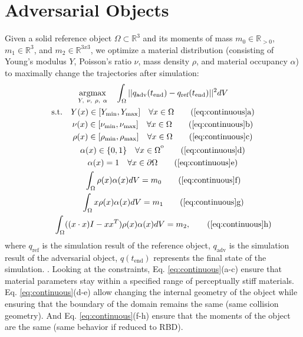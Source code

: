 \section{Adversarial Objects}\label{sec:method}
%
%
Given a solid reference object $\Omega \subset \mathbb{R}^3$ and its moments of mass $m_0 \in \mathbb{R}_{>0}$, $m_1 \in \mathbb{R}^3$, and $m_2 \in \mathbb{R}^{3x3}$, we optimize a material distribution (consisting of Young's modulus $Y$, Poisson's ratio $\nu$, mass density $\rho$, and material occupancy $\alpha$) to maximally change the trajectories after simulation:
\begin{gather}
\underset{Y,\ \nu,\ \rho,\ \alpha}{\mathrm{argmax}} \quad  \int_\Omega || q_\text{adv}(t_\text{end}) -  q_\text{ref}(t_\text{end}) ||^2 dV  \label{eq:continuous} \\
\text{s.t.}\quad                    Y(x) \in [Y_\text{min}, Y_\text{max}]\quad \forall x \in \Omega  \tag{\ref{eq:continuous}a} \\
\phantom{\text{s.t.}}\quad   \nu(x) \in [\nu_\text{min}, \nu_\text{max}] \quad \forall x \in \Omega   \tag{\ref{eq:continuous}b} \\
\phantom{\text{s.t.}}\quad   \rho(x) \in [\rho_\text{min}, \rho_\text{max}] \quad \forall x \in \Omega  \tag{\ref{eq:continuous}c} \\
\phantom{\text{s.t.}}\quad   \alpha(x) \in \{0, 1\} \quad \forall x \in \Omega\strut^\mathrm{o} \tag{\ref{eq:continuous}d} \\
\phantom{\text{s.t.}}\quad   \alpha(x) = 1 \quad \forall x \in \partial \Omega  \tag{\ref{eq:continuous}e} \\
\phantom{\text{s.t.}}\quad   \int_\Omega \rho(x)\alpha(x) dV = m_0 \tag{\ref{eq:continuous}f} \\
\phantom{\text{s.t.}}\quad   \int_\Omega x \rho(x)\alpha(x) dV = m_1 \tag{\ref{eq:continuous}g} \\
\phantom{\text{s.t.}}\quad   \int_\Omega ((x \cdot x)I - xx^T) \rho(x)\alpha(x) dV = m_2, \tag{\ref{eq:continuous}h}
\end{gather}
where $q_\text{ref}$ is the simulation result of the reference object, $q_\text{adv}$ is the simulation result of the adversarial object, $q(t_\text{end})$ represents the final state of the simulation. . Looking at the constraints, Eq. \ref{eq:continuous}(a-c) ensure that material parameters stay within a specified range of perceptually stiff materials. Eq. \ref{eq:continuous}(d-e) allow changing the internal geometry of the object while ensuring that the boundary of the domain remains the same (same collision geometry). And Eq. \ref{eq:continuous}(f-h) ensure that the moments of the object are the same (same behavior if reduced to RBD).
